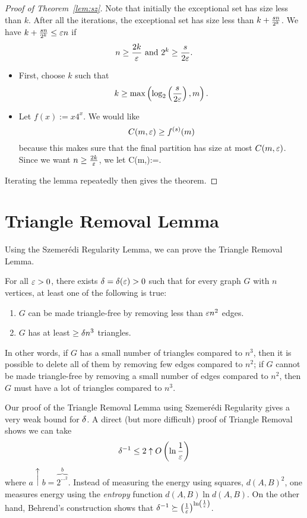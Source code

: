 \begin{proof}[Proof of Theorem~\ref{lem:sz}]
Note that initially the exceptional set has size less than $k$.
After all the iterations, the exceptional set has size less than $k+\frac{sn}{2^k}$. We have $k+\frac{sn}{2^k}\le \varepsilon n$ if
\[
n\ge\frac{2k}{\varepsilon}\text{ and }2^k\ge \frac{s}{2\varepsilon }.
\]
\begin{itemize}
\item
First, choose $k$ such that
\[
k\ge\max\left( { \log_2\left( {\frac{s}{2\varepsilon }} \right),m} \right).
\]
\item
Let $f(x):=x4^x$. We would like
\[C(m,\varepsilon)\ge f^{(s)}(m)\]
because this makes sure that the final partition has size at most $C(m,\varepsilon)$. Since we want $n\ge\frac{2k}{\varepsilon}$, we let
C(m,\ep):=\max{}.
\eeq
\end{itemize}
Iterating the lemma repeatedly then gives the theorem.
\end{proof}

\section{Triangle Removal Lemma}

Using the Szemer\'edi Regularity Lemma, we can prove the Triangle Removal Lemma.
\begin{lem}
For all $\varepsilon>0$, there exists $\delta=\delta(\varepsilon)>0$ such that for every graph $G$ with $n$ vertices, at least one of the following is true:
\begin{enumerate}
\item
$G$ can be made triangle-free by removing less than $\varepsilon n^2$ edges.
\item
$G$ has at least $\ge \delta n^3$ triangles.
\end{enumerate}
\end{lem}
In other words, if $G$ has a small number of triangles compared to $n^3$, then it is possible to delete all of them by removing few edges compared to $n^2$; if $G$ cannot be made triangle-free by removing a small number of edges compared to $n^2$, then $G$ must have a lot of triangles compared to $n^3$.
\begin{rem}
Our proof of the Triangle Removal Lemma using Szemer\'edi Regularity gives a very weak bound for $\delta$. A direct (but more difficult) proof of Triangle Removal shows we can take
\[
\delta^{-1}\le 2\uparrow O\left( {\ln\frac{1}{\varepsilon}} \right)
\]
where $a\uparrow b=\overbrace{2^{\cdots ^2}}^b$. Instead of measuring the energy using squares, $d(A,B)^2$, one measures energy using the {\it entropy} function $d(A,B)\ln d(A,B)$. 
On the other hand, Behrend's construction shows that $\delta^{-1}\succeq \left( {\frac{1}{\varepsilon}} \right)^{\ln \left( {\frac{1}{\varepsilon}} \right)}$.
\end{rem}

